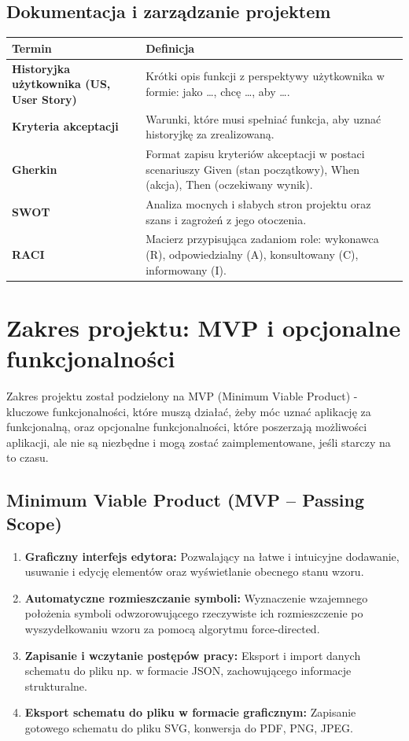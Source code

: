 \documentclass[a4paper,11pt]{article}
\begin{document}
\subsection{Dokumentacja i zarządzanie projektem}

\begin{tabularx}{0.95\textwidth}{|p{5cm}|X|}
	\hline
	\textbf{Termin} & \textbf{Definicja} \\
	\hline
	\textbf{Historyjka użytkownika (US, User Story)} & Krótki opis funkcji z perspektywy użytkownika w formie: jako \dots, chcę \dots, aby \dots. \\
	\hline
	\textbf{Kryteria akceptacji} & Warunki, które musi spełniać funkcja, aby uznać historyjkę za zrealizowaną. \\
	\hline
	\textbf{Gherkin} & Format zapisu kryteriów akceptacji w postaci scenariuszy Given (stan początkowy), When (akcja), Then (oczekiwany wynik). \\
	\hline
	\textbf{SWOT} & Analiza mocnych i słabych stron projektu oraz szans i zagrożeń z jego otoczenia. \\
	\hline
	\textbf{RACI} & Macierz przypisująca zadaniom role: wykonawca (R), odpowiedzialny (A), konsultowany (C), informowany (I). \\
	\hline
\end{tabularx}

\pagebreak

\section{Zakres projektu: MVP i opcjonalne funkcjonalności}

Zakres projektu został podzielony na MVP (Minimum Viable Product) - kluczowe funkcjonalności, które muszą działać, żeby móc uznać aplikację za funkcjonalną, oraz opcjonalne funkcjonalności, które poszerzają możliwości aplikacji, ale nie są niezbędne i mogą zostać zaimplementowane, jeśli starczy na to czasu.

\subsection{Minimum Viable Product (MVP – Passing Scope)}

\begin{enumerate}
  \item \textbf{Graficzny interfejs edytora:} Pozwalający na łatwe i intuicyjne dodawanie, usuwanie i edycję elementów oraz wyświetlanie obecnego stanu wzoru.
  \item \textbf{Automatyczne rozmieszczanie symboli:} Wyznaczenie wzajemnego położenia symboli odwzorowującego rzeczywiste ich rozmieszczenie po wyszydełkowaniu wzoru za pomocą algorytmu force-directed.
  \item \textbf{Zapisanie i wczytanie postępów pracy:} Eksport i import danych schematu do pliku np. w formacie JSON, zachowującego informacje strukturalne.
  \item \textbf{Eksport schematu do pliku w formacie graficznym:} Zapisanie gotowego schematu do pliku SVG, konwersja do PDF, PNG, JPEG.
\end{enumerate}
\end{document}
